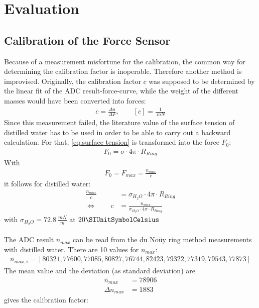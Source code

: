 \chapter{Evaluation}
%
\section{Calibration of the Force Sensor}
Because of a measurement misfortune for the calibration, the common way for determining the calibration factor is inoperable. Therefore another method is improvised. Originally, the calibration factor $ c $ was supposed to be determined by the linear fit of the ADC result-force-curve, while the weight of the different masses would have been converted into forces:
\begin{align}
c=\frac{\Delta n}{\Delta F}, \qquad [c]=\frac{1}{\SI{}{mN}}
\end{align}
Since this measurement failed, the literature value of the surface tension of distilled water has to be used in order to be able to carry out a backward calculation. For that, \cref{eq:surface tension} is transformed into the force $ F_0 $:
\begin{align*}
F_0=\sigma \cdot 4\pi \cdot R_{Ring}
\end{align*}
With
\begin{align}
F_0=F_{max}=\frac{n_{max}}{c}
\label{eq:force}
\end{align}
it follows for distilled water:
\begin{align}
\frac{n_{max}}{c}&=\sigma_{H_2O} \cdot 4\pi \cdot R_{Ring} \nonumber \\
\Leftrightarrow \qquad c&=\frac{n_{max}}{\sigma_{H_2O} \cdot 4\pi \cdot R_{Ring}}
\label{eq:calibration factor}
\end{align}
with $ \sigma_{H_2O}=\SI{72.8}{\frac{mN}{m}} $ at $ 20 \SIUnitSymbolCelsius $ \cite{Eichler.2016}
\\\\
The ADC result $ n_{max} $ can be read from the du Noüy ring method measurements with distilled water. There are 10 values for $ n_{max} $:
\begin{align*}
n_{max,i}=[80321, 77600, 77085, 80827, 76744, 82423, 79322, 77319, 79543, 77873]
\end{align*}
The mean value and the deviation (as standard deviation) are
\begin{align*}
\bar{n}_{max}&=78906\\
\Delta n_{max}&=1883
\end{align*}
 gives the calibration factor:
